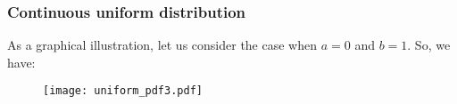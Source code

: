 \documentclass[notes=show,smaller,handout]{beamer}\usepackage[]{graphicx}\usepackage[]{color}
\begin{document}
%
%

\begin{frame}%

\frametitle{Continuous uniform distribution}

As a graphical illustration, let us consider the case when $a=0$ and $b=1$. So, we have:%
\begin{figure}[ptb]\centering
\texttt{[image: uniform\_pdf3.pdf]}%
\end{figure}%


\end{frame}%
\end{document}
